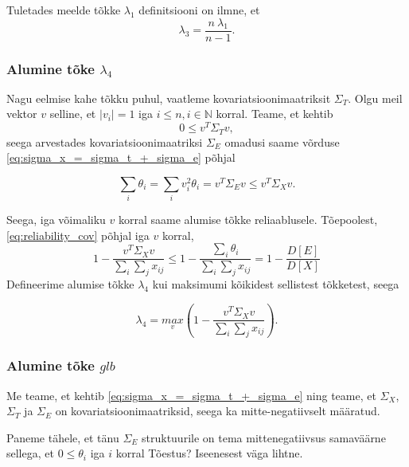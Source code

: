 \documentclass[a4paper,12pt]{article}
\numberwithin{equation}{section}
\theoremstyle{definition}
\begin{document}
Tuletades meelde tõkke $\lambda_1$ definitsiooni on ilmne, et
\begin{equation}
\label{eq:lambda_3_from_lambda_1}
\lambda_3 = \frac{n\ \lambda_1}{n-1}.
\end{equation}
 

 
\subsubsection{Alumine tõke $\lambda_4$}

Nagu eelmise kahe tõkku puhul, vaatleme kovariatsioonimaatriksit $\Sigma_T$. Olgu meil vektor $v$ selline, et $\lvert {v_i} \rvert = 1$ iga $i \leq n, i \in \mathbb{N}$ korral.    
Teame, et kehtib
\begin{equation*}
0 \leq v^{T} \Sigma_T v,
\end{equation*}
seega arvestades kovariatsioonimaatriksi $\Sigma_E$ omadusi saame võrduse \eqref{eq:sigma_x_=_sigma_t_+_sigma_e} põhjal 

\begin{equation*}
\sum_i \theta_i = \sum_i v_{i}^{2} \theta_i = v^{T} \Sigma_E v \leq v^{T} \Sigma_X v.
\end{equation*}

Seega, iga võimaliku $v$ korral saame alumise tõkke reliaablusele. Tõepoolest, \eqref{eq:reliability_cov} põhjal iga $v$ korral,  
\begin{equation*}
1 - \frac{v^T \Sigma_X v}{\sum_i \sum_j x_{ij}} \leq 1 - \frac{\sum_i \theta_i}{\sum_i \sum_j x_{ij}} = 1 - \frac{D \left[ E \right]}{ D \left[X \right]  }
\end{equation*} 
Defineerime alumise tõkke $\lambda_4$ kui maksimumi kõikidest sellistest tõkketest, seega

\begin{equation*}
\lambda_4  = \underset{v}{max} \left( 1 - \frac{v^{T} \Sigma_X v}{\sum_i \sum_j x_{ij}} \right).
\end{equation*}


\subsubsection{Alumine tõke $glb$}

Me teame, et kehtib \eqref{eq:sigma_x_=_sigma_t_+_sigma_e} ning teame, et $\Sigma_X$, $\Sigma_T$ ja $\Sigma_E$ on kovariatsioonimaatriksid, seega ka mitte-negatiivselt määratud.

Paneme tähele, et tänu $\Sigma_E$ struktuurile on tema mittenegatiivsus samaväärne sellega, et $0 \leq \theta_i$ iga $i$ korral {\color{cyan} Tõestus? Iseenesest väga lihtne}. 
\end{document}
